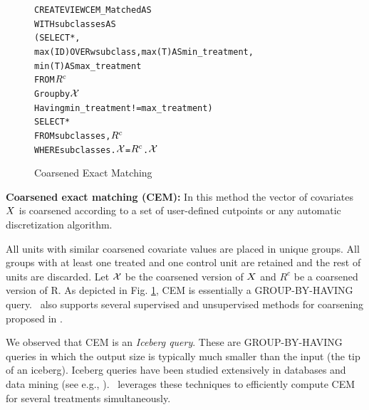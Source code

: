 {{}















\begin{figure}
\begin{alltt} \scriptsize
CREATE VIEW CEM_Matched AS
WITH subclasses AS
  (SELECT *,
          max(ID) OVER w subclass, max(T) AS min_treatment,
          min(T)AS max_treatment
   FROM \(\crele\)
   Group by \(\ccv\)
   Having min_treatment!=max_treatment)
SELECT *
FROM subclasses,\(\crele\)
WHERE subclasses.\(\ccv\)=\(\crele\).\(\ccv\)

\end{alltt}
\vspace{-.45cm}
  \caption{Coarsened Exact Matching}\label{fig:cem}
\end{figure}



{\bf Coarsened exact matching (CEM):} In this method the vector of covariates ${{X}}$ is
coarsened according to a set of user-defined cutpoints or any
automatic discretization algorithm.
All units with similar coarsened
covariate values are placed in unique groups. All
groups with at least one treated and one control unit are retained
and the rest of units are discarded.  Let ${{\mathcal{X}}}$ be the
coarsened version of ${{X}}$ and $R^c$ be a coarsened
version of R. As depicted in Fig. \ref{fig:cem},
CEM is essentially a GROUP-BY-HAVING query.
 \GSQL\  also supports several supervised and unsupervised methods for coarsening proposed in \cite{dougherty1995supervised}.

We observed that CEM is an {\em Iceberg query}.  These are  GROUP-BY-HAVING queries
in which the output size is typically much smaller than the input (the
tip of an iceberg). Iceberg queries have been studied
extensively in databases and data mining (see e.g.,
\cite{fang1999computing,findlater2003iceberg}).
\GSQL\ leverages these techniques to efficiently compute CEM for several treatments simultaneously.


}
